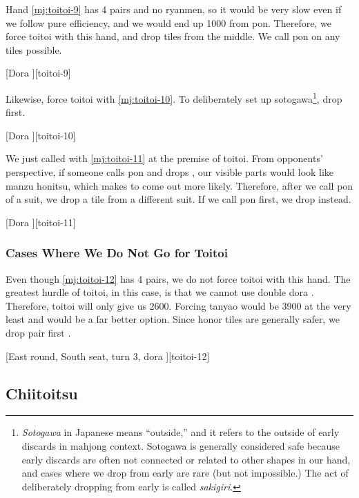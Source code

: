 \documentclass[12pt]{article}
\newlength\stdbls %
\newcommand{\mjfn}[1]{\raisebox{-.135\stdbls}{\mahjong[0.75\stdbls]{#1}}}
\begin{document}
Hand \ref{mj:toitoi-9} has 4 pairs and no ryanmen, so it would be very slow even if we follow pure efficiency, and we would end up 1000 from  pon. Therefore, we force toitoi with this hand, and drop tiles from the middle. We call pon on any tiles possible.

[Dora ][toitoi-9]

Likewise, force toitoi with \ref{mj:toitoi-10}. To deliberately set up sotogawa\footnote{\textit{Sotogawa} in Japanese means ``outside,'' and it refers to the outside of early discards in mahjong context. Sotogawa is generally considered safe because early discards are often not connected or related to other shapes in our hand, and cases where we drop \mjfn{3m} from \mjfn{334m} early are rare (but not impossible.) The act of deliberately dropping \mjfn{3m} from \mjfn{334m} early is called \textit{sakigiri}.}, drop  first.

[Dora ][toitoi-10]

We just called  with \ref{mj:toitoi-11} at the premise of toitoi. From opponents' perspective, if someone calls  pon and drops , our visible parts would look like manzu honitsu, which makes  to come out more likely. Therefore, after we call pon of a suit, we drop a tile from a different suit. If we call  pon first, we drop  instead.

[Dora ][toitoi-11]


\subsubsection*{Cases Where We Do Not Go for Toitoi}

Even though \ref{mj:toitoi-12} has 4 pairs, we do not force toitoi with this hand. The greatest hurdle of toitoi, in this case, is that we cannot use double dora . Therefore, toitoi will only give us 2600. Forcing tanyao would be 3900 at the very least and would be a far better option. Since honor tiles are generally safer, we drop  pair first \citep[][pp.~128--129]{fkt}.

[East round, South seat, turn 3, dora ][toitoi-12]


\subsection{Chiitoitsu}
\end{document}
